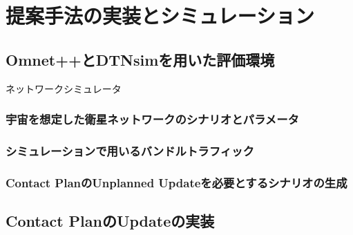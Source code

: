 \chapter{提案手法の実装とシミュレーション}
\label{chap:implementation_and_experimentation}

\section{Omnet++とDTNsimを用いた評価環境}
ネットワークシミュレータ
\subsection{宇宙を想定した衛星ネットワークのシナリオとパラメータ}
\subsection{シミュレーションで用いるバンドルトラフィック}

\subsection{Contact PlanのUnplanned Updateを必要とするシナリオの生成}
\section{Contact PlanのUpdateの実装}